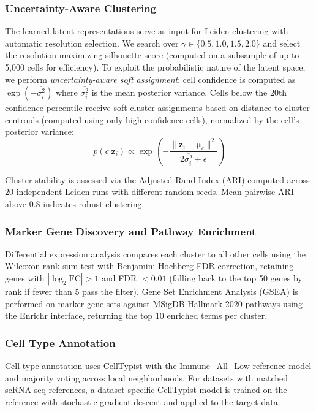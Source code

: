 \documentclass{article}
\begin{document}
\subsubsection{Uncertainty-Aware Clustering}

The learned latent representations serve as input for Leiden clustering \citep{traag2019louvain} with automatic resolution selection. We search over $\gamma \in \{0.5, 1.0, 1.5, 2.0\}$ and select the resolution maximizing silhouette score (computed on a subsample of up to 5,000 cells for efficiency). To exploit the probabilistic nature of the latent space, we perform \emph{uncertainty-aware soft assignment}: cell confidence is computed as $\exp(-\overline{\sigma_i^2})$ where $\overline{\sigma_i^2}$ is the mean posterior variance. Cells below the 20th confidence percentile receive soft cluster assignments based on distance to cluster centroids (computed using only high-confidence cells), normalized by the cell's posterior variance:
\begin{equation}
p(c | \mathbf{z}_i) \propto \exp\left(-\frac{\|\mathbf{z}_i - \boldsymbol{\mu}_c\|^2}{2\overline{\sigma_i^2} + \epsilon}\right)
\end{equation}

Cluster stability is assessed via the Adjusted Rand Index (ARI) computed across 20 independent Leiden runs with different random seeds. Mean pairwise ARI above 0.8 indicates robust clustering.

\subsubsection{Marker Gene Discovery and Pathway Enrichment}

Differential expression analysis compares each cluster to all other cells using the Wilcoxon rank-sum test with Benjamini-Hochberg FDR correction, retaining genes with $|\log_2 \text{FC}| > 1$ and FDR $< 0.01$ (falling back to the top 50 genes by rank if fewer than 5 pass the filter). Gene Set Enrichment Analysis (GSEA) \citep{subramanian2005gene} is performed on marker gene sets against MSigDB Hallmark 2020 pathways using the Enrichr interface, returning the top 10 enriched terms per cluster.

\subsubsection{Cell Type Annotation}

Cell type annotation uses CellTypist \citep{dominguez2022cross} with the Immune\_All\_Low reference model and majority voting across local neighborhoods. For datasets with matched scRNA-seq references, a dataset-specific CellTypist model is trained on the reference with stochastic gradient descent and applied to the target data.
\end{document}
